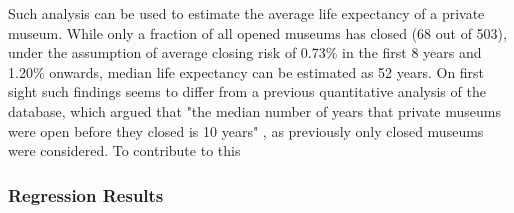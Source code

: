 \documentclass[12pt]{article}
\begin{document}
Such analysis can be used to estimate the average life expectancy of a private museum.
While only a fraction of all opened museums has closed (68 out of 503), under the assumption of average closing risk of 0.73\% in the first 8 years and 1.20\% onwards, median life expectancy can be estimated as 52 years.
On first sight such findings seems to differ from a previous quantitative analysis of the database, which argued that "the median number of years that private museums were open before they closed is 10 years" \parencite[p.5]{Velthuis_Gera_2024_fragility}, as previously only closed museums were considered.
To contribute to this 
\subsubsection*{Regression Results}
\end{document}
